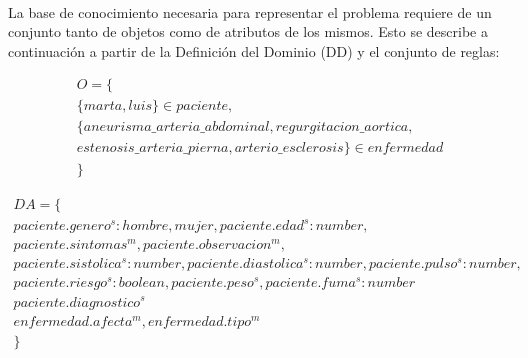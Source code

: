 \documentclass[10pt, a4paper,spanish]{article}
\begin{document}
		\paragraph{}
		La base de conocimiento necesaria para representar el problema requiere de un conjunto tanto de objetos como de atributos de los mismos. Esto se describe a continuación a partir de la Definición del Dominio (DD) y el conjunto de reglas:

		\begin{multline*}
			O = \{ \\
				\{marta, luis\} \in paciente, \\
				\{aneurisma\_arteria\_abdominal, regurgitacion\_aortica, \\
				estenosis\_arteria\_pierna, arterio\_esclerosis \} \in enfermedad \\
			\}
		\end{multline*}

		\begin{multline*}
			DA = \{ \\
				paciente.genero^s:{hombre, mujer}, paciente.edad^s:number, \\
				paciente.sintomas^m, paciente.observacion^m, \\
				paciente.sistolica^s:number, paciente.diastolica^s:number, paciente.pulso^s:number, \\
				paciente.riesgo^s:boolean, paciente.peso^s, paciente.fuma^s:number \\
				paciente.diagnostico^s \\
				enfermedad.afecta^m, enfermedad.tipo^m \\
			\}
		\end{multline*}
\end{document}

